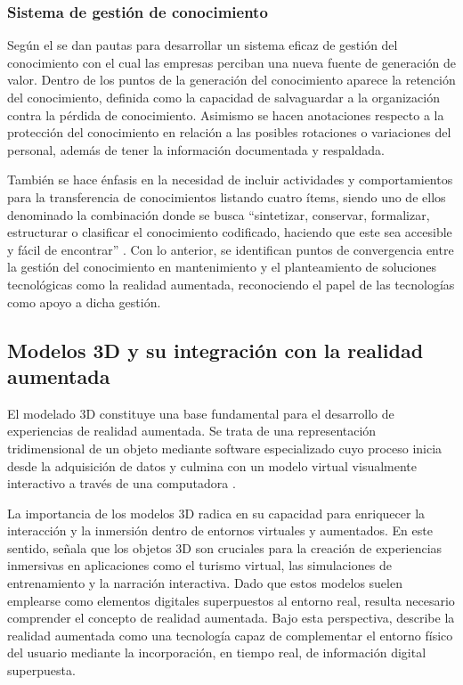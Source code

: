         \subsubsection{Sistema de gestión de conocimiento}

            Según el \textcite{ICONTEC:2019} se dan pautas para desarrollar un sistema eficaz de gestión del conocimiento con el cual las empresas perciban una nueva fuente de generación de valor. Dentro de los puntos de la generación del conocimiento aparece la retención del conocimiento, definida como la capacidad de salvaguardar a la organización contra la pérdida de conocimiento. Asimismo se hacen anotaciones respecto a la protección del conocimiento en relación a las posibles rotaciones o variaciones del personal, además de tener la información documentada y respaldada.

            También se hace énfasis en la necesidad de incluir actividades y comportamientos para la transferencia de conocimientos listando cuatro ítems, siendo uno de ellos denominado la combinación donde se busca “sintetizar, conservar, formalizar, estructurar o clasificar el conocimiento codificado, haciendo que este sea accesible y fácil de encontrar” \parencite[p. 7]{ICONTEC:2019}. Con lo anterior, se identifican puntos de convergencia entre la gestión del conocimiento en mantenimiento y el planteamiento de soluciones tecnológicas como la realidad aumentada, reconociendo el papel de las tecnologías como apoyo a dicha gestión.

    \subsection{Modelos 3D y su integración con la realidad aumentada}

        El modelado 3D constituye una base fundamental para el desarrollo de experiencias de realidad aumentada. Se trata de una representación tridimensional de un objeto mediante software especializado cuyo proceso inicia desde la adquisición de datos y culmina con un modelo virtual visualmente interactivo a través de una computadora \parencite{GHUGE:2023}.

        La importancia de los modelos 3D radica en su capacidad para enriquecer la interacción y la inmersión dentro de entornos virtuales y aumentados. En este sentido, \textcite{GHUGE:2023} señala que los objetos 3D son cruciales para la creación de experiencias inmersivas en aplicaciones como el turismo virtual, las simulaciones de entrenamiento y la narración interactiva. Dado que estos modelos suelen emplearse como elementos digitales superpuestos al entorno real, resulta necesario comprender el concepto de realidad aumentada. Bajo esta perspectiva, \textcite{ARENAS:2022} describe la realidad aumentada como una tecnología capaz de complementar el entorno físico del usuario mediante la incorporación, en tiempo real, de información digital superpuesta.

